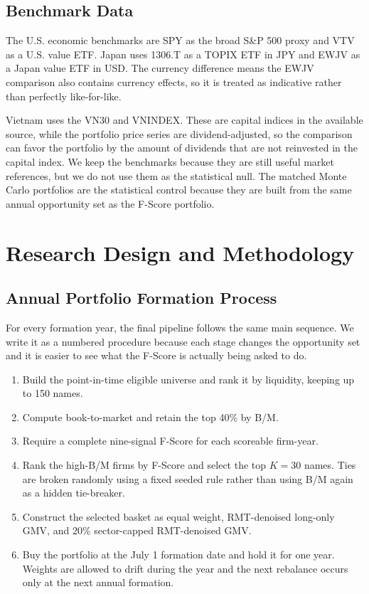 \documentclass[11pt,a4paper]{report}
\numberwithin{figure}{chapter}
\numberwithin{table}{chapter}
\numberwithin{equation}{chapter}
\begin{document}
\section{Benchmark Data}

The U.S. economic benchmarks are SPY as the broad S\&P 500 proxy and VTV as a U.S. value ETF. Japan uses 1306.T as a TOPIX ETF in JPY and EWJV as a Japan value ETF in USD. The currency difference means the EWJV comparison also contains currency effects, so it is treated as indicative rather than perfectly like-for-like.

Vietnam uses the VN30 and VNINDEX. These are capital indices in the available source, while the portfolio price series are dividend-adjusted, so the comparison can favor the portfolio by the amount of dividends that are not reinvested in the capital index. We keep the benchmarks because they are still useful market references, but we do not use them as the statistical null. The matched Monte Carlo portfolios are the statistical control because they are built from the same annual opportunity set as the F-Score portfolio.

\chapter{Research Design and Methodology}
\label{chap:methodology}

\section{Annual Portfolio Formation Process}

For every formation year, the final pipeline follows the same main sequence. We write it as a numbered procedure because each stage changes the opportunity set and it is easier to see what the F-Score is actually being asked to do.

\begin{enumerate}
    \item Build the point-in-time eligible universe and rank it by liquidity, keeping up to 150 names.
    \item Compute book-to-market and retain the top 40\% by B/M.
    \item Require a complete nine-signal F-Score for each scoreable firm-year.
    \item Rank the high-B/M firms by F-Score and select the top $K=30$ names. Ties are broken randomly using a fixed seeded rule rather than using B/M again as a hidden tie-breaker.
    \item Construct the selected basket as equal weight, RMT-denoised long-only GMV, and 20\% sector-capped RMT-denoised GMV.
    \item Buy the portfolio at the July 1 formation date and hold it for one year. Weights are allowed to drift during the year and the next rebalance occurs only at the next annual formation.
\end{enumerate}
\end{document}
